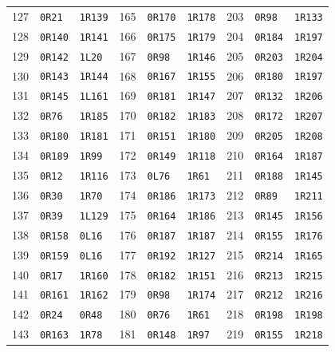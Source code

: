 \begin{center}
\begin{tabular}{rll@{\hspace{9mm}}rll@{\hspace{9mm}}rll}
127 & \texttt{0R21} & \texttt{1R139} & 165 & \texttt{0R170} & \texttt{1R178} & 203 & \texttt{0R98} & \texttt{1R133} \\
128 & \texttt{0R140} & \texttt{1R141} & 166 & \texttt{0R175} & \texttt{1R179} & 204 & \texttt{0R184} & \texttt{1R197} \\
129 & \texttt{0R142} & \texttt{1L20} & 167 & \texttt{0R98} & \texttt{1R146} & 205 & \texttt{0R203} & \texttt{1R204} \\
130 & \texttt{0R143} & \texttt{1R144} & 168 & \texttt{0R167} & \texttt{1R155} & 206 & \texttt{0R180} & \texttt{1R197} \\
131 & \texttt{0R145} & \texttt{1L161} & 169 & \texttt{0R181} & \texttt{1R147} & 207 & \texttt{0R132} & \texttt{1R206} \\
132 & \texttt{0R76} & \texttt{1R185} & 170 & \texttt{0R182} & \texttt{1R183} & 208 & \texttt{0R172} & \texttt{1R207} \\
133 & \texttt{0R180} & \texttt{1R181} & 171 & \texttt{0R151} & \texttt{1R180} & 209 & \texttt{0R205} & \texttt{1R208} \\
134 & \texttt{0R189} & \texttt{1R99} & 172 & \texttt{0R149} & \texttt{1R118} & 210 & \texttt{0R164} & \texttt{1R187} \\
135 & \texttt{0R12} & \texttt{1R116} & 173 & \texttt{0L76} & \texttt{1R61} & 211 & \texttt{0R188} & \texttt{1R145} \\
136 & \texttt{0R30} & \texttt{1R70} & 174 & \texttt{0R186} & \texttt{1R173} & 212 & \texttt{0R89} & \texttt{1R211} \\
137 & \texttt{0R39} & \texttt{1L129} & 175 & \texttt{0R164} & \texttt{1R186} & 213 & \texttt{0R145} & \texttt{1R156} \\
138 & \texttt{0R158} & \texttt{0L16} & 176 & \texttt{0R187} & \texttt{1R187} & 214 & \texttt{0R155} & \texttt{1R176} \\
139 & \texttt{0R159} & \texttt{0L16} & 177 & \texttt{0R192} & \texttt{1R127} & 215 & \texttt{0R214} & \texttt{1R165} \\
140 & \texttt{0R17} & \texttt{1R160} & 178 & \texttt{0R182} & \texttt{1R151} & 216 & \texttt{0R213} & \texttt{1R215} \\
141 & \texttt{0R161} & \texttt{1R162} & 179 & \texttt{0R98} & \texttt{1R174} & 217 & \texttt{0R212} & \texttt{1R216} \\
142 & \texttt{0R24} & \texttt{0R48} & 180 & \texttt{0R76} & \texttt{1R61} & 218 & \texttt{0R198} & \texttt{1R198} \\
143 & \texttt{0R163} & \texttt{1R78} & 181 & \texttt{0R148} & \texttt{1R97} & 219 & \texttt{0R155} & \texttt{1R218} \\

\end{tabular}
\end{center}

